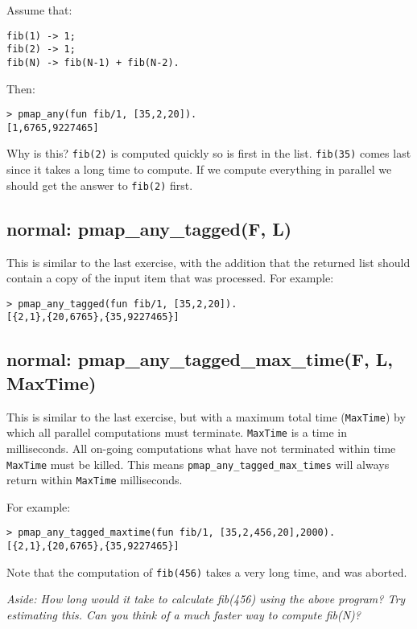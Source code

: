 \documentclass[12pt]{hitec}
\begin{document}
Assume that:

\begin{Verbatim}
fib(1) -> 1;
fib(2) -> 1; 
fib(N) -> fib(N-1) + fib(N-2).
\end{Verbatim}

Then:

\begin{Verbatim}
> pmap_any(fun fib/1, [35,2,20]).
[1,6765,9227465]
\end{Verbatim}

Why is this? \verb+fib(2)+ is computed quickly so is first in the
list.  \verb+fib(35)+ comes last since it takes a long time to
compute. If we compute everything in parallel we should get the answer
to \verb+fib(2)+ first.

\subsection{normal: pmap\_any\_tagged(F, L)}

This is similar to the last exercise, with the addition that the returned
list should contain a copy of the input item that was processed. For example:

\begin{Verbatim}
> pmap_any_tagged(fun fib/1, [35,2,20]).
[{2,1},{20,6765},{35,9227465}]
\end{Verbatim}

\subsection{normal: pmap\_any\_tagged\_max\_time(F, L, MaxTime)}

This is similar to the last exercise, but with a maximum total time
(\verb+MaxTime+) by which all parallel computations must
terminate. \verb+MaxTime+ is a time in milliseconds.  All on-going
computations what have not terminated within time \verb+MaxTime+ must
be killed. This means \verb+pmap_any_tagged_max_times+ will always
return within \verb+MaxTime+ milliseconds.

For example:

\begin{Verbatim}
> pmap_any_tagged_maxtime(fun fib/1, [35,2,456,20],2000).
[{2,1},{20,6765},{35,9227465}]
\end{Verbatim}

Note that the computation of \verb+fib(456)+ takes a very long time,
and was aborted.

{\sl Aside: How long would it take to calculate fib(456) using the above program?
Try estimating this. Can you think of a much faster way to compute fib(N)?}
\end{document}
